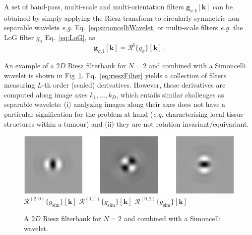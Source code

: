 \documentclass[fleqn,a4paper,oneside,openany]{book}
\begin{document}
A set of band-pass, multi-scale and multi-orientation filters $\boldsymbol{g}_{\sigma,\boldsymbol{l}}[\boldsymbol{k}]$ can be obtained by simply applying the Riesz transform to circularly symmetric non-separable wavelets \textit{e.g.} Eq.~\eqref{eq:simoncelliWavelet} or multi-scale filters \textit{e.g.} the LoG filter $g_{\sigma}$ Eq.~\eqref{eq:LoG}, as
%
\begin{equation}\label{eq:rieszFilter}
\boldsymbol{g}_{\sigma,\boldsymbol{l}}[\boldsymbol{k}] = 
\boldsymbol{\mathcal{R}}^{\boldsymbol{l}}
\{g_{\sigma}\}[\boldsymbol{k}].
\end{equation}

An example of a 2$D$ Riesz filterbank for $N=2$ and combined with a Simoncelli wavelet is shown in Fig~\ref{fig:Riesz}.
Eq.~\eqref{eq:rieszFilter} yields a collection of filters measuring $L$-th order (scaled) derivatives. However, these derivatives are computed along image axes $k_1,\dots,k_D$, which entails similar challenges as separable wavelets: (i) analyzing images along their axes does not have a particular signification for the problem at hand (\textit{e.g.} characterising local tissue structures within a tumour) and (ii) they are not rotation invariant/equivariant.

%
\begin{figure}
\centering
\includegraphics[trim = 0 0 0 0, clip, width=0.7\linewidth]{Riesz.png}\\
$\mathcal{R}^{(2,0)}
\{g_{\text{sim}}\}[\boldsymbol{k}]$
\hspace{1.3cm}
$\mathcal{R}^{(1,1)}
\{g_{\text{sim}}\}[\boldsymbol{k}]$
\hspace{1.3cm}
$\mathcal{R}^{(0,2)}
\{g_{\text{sim}}\}[\boldsymbol{k}]$
\caption{A 2$D$ Riesz filterbank for $N=2$ and combined with a Simoncelli wavelet.}
  \label{fig:Riesz}
\end{figure}
%
\end{document}
